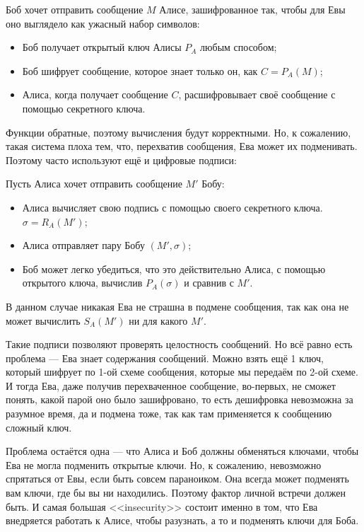\documentclass[a4paper, 12pt]{article}
\begin{document}
\begin{center}
  Боб хочет отправить сообщение $M$ Алисе, зашифрованное так, чтобы для Евы оно
  выглядело как ужасный набор символов:
  \begin{itemize}
    \item Боб получает открытый ключ Алисы $P_{A}$ любым способом;
    \item Боб шифрует сообщение, которое знает только он, как $C = P_{A}(M)$;
    \item Алиса, когда получает сообщение $C$, расшифровывает своё сообщение с
    помощью секретного ключа.
  \end{itemize}
\end{center}

Функции обратные, поэтому вычисления будут корректными. Но, к сожалению, такая 
система плоха тем, что, перехватив сообщения, Ева может их подменивать. Поэтому
часто используют ещё и цифровые подписи:

\begin{center}
Пусть Алиса хочет отправить сообщение $M'$ Бобу:
  \begin{itemize}
    \item Алиса вычисляет свою подпись с помощью своего секретного ключа.
    $\sigma = R_{A}(M')$;
    \item Алиса отправляет пару Бобу $(M', \sigma)$;
    \item Боб может легко убедиться, что это действительно Алиса, с помощью
    открытого ключа, вычислив $P_{A}(\sigma)$ и сравнив с $M'$.
  \end{itemize}
\end{center}

В данном случае никакая Ева не страшна в подмене сообщения, так как она не может
вычислить $S_{A}(M')$ ни для какого $M'$.

Такие подписи позволяют проверять целостность сообщений. Но всё равно есть
проблема --- Ева знает содержания сообщений. Можно взять ещё 1 ключ, который
шифрует по 1-ой схеме сообщения, которые мы передаём по 2-ой схеме. И тогда
Ева, даже получив перехваченное сообщение, во-первых, не сможет понять, какой
парой оно было зашифровано, то есть дешифровка невозможна за разумное время,
да и подмена тоже, так как там применяется к сообщению сложный ключ.

Проблема остаётся одна --- что Алиса и Боб должны обменяться ключами, чтобы
Ева не могла подменить открытые ключи. Но, к сожалению, невозможно спрятаться
от Евы, если быть совсем параноиком. Она всегда может подменять вам ключи, где
бы вы ни находились. Поэтому фактор личной встречи должен быть. И самая большая
<<insecurity>> состоит именно в том, что Ева внедряется работать к Алисе,
чтобы разузнать, а то и подменять ключи для Боба.
\end{document}
